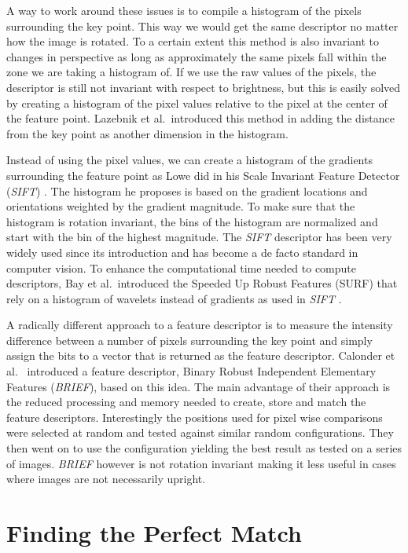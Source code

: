 A way to work around these issues is to compile a histogram of the 
pixels surrounding the key point. This way we would get the same 
descriptor no matter how the image is rotated. To a certain extent this
method is also invariant to changes in perspective as long as 
approximately the same pixels fall within the zone we are taking a 
histogram of. If we use the raw values of the pixels, the descriptor is 
still not invariant with respect to brightness, but this is easily 
solved by creating a histogram of the pixel values relative to the pixel 
at the center of the feature point.  Lazebnik et al.\ introduced this 
method in \cite{lazebnik2003sparse} adding the distance from the key 
point as another dimension in the histogram.

Instead of using the pixel values, we can create a histogram of the 
gradients surrounding the feature point as Lowe did in his Scale 
Invariant Feature Detector (\emph{SIFT}) \cite{lowe2004sift}. The 
histogram he proposes is based on the gradient locations and 
orientations weighted by
the gradient magnitude. To make sure that the histogram is rotation 
invariant, the bins of the histogram are normalized and start with the 
bin of the highest magnitude. The \emph{SIFT} descriptor has been very 
widely used since its introduction and has become a de facto standard in 
computer vision. To enhance the computational time needed to compute 
descriptors, Bay et al.\ introduced the Speeded Up Robust Features 
(SURF) that rely on a histogram of wavelets instead of gradients as used 
in \emph{SIFT} \cite{bay2006surf}. 

A radically different approach to a feature descriptor is to measure the
intensity difference between a number of pixels surrounding the key 
point and simply assign the bits to a vector that is returned as the 
feature descriptor. Calonder et al.\ \cite{calonder2010brief} introduced 
a feature descriptor, Binary Robust Independent Elementary Features 
(\emph{BRIEF}), based on this idea. The main advantage of their approach 
is the reduced processing and memory needed to create, store and match 
the feature descriptors. Interestingly the positions used for pixel wise 
comparisons were selected at random and tested against similar random 
configurations. They then went on to use the configuration yielding the 
best result as tested on a series of images. \emph{BRIEF} however is not 
rotation invariant making it less useful in cases where images are not 
necessarily upright.

\section{Finding the Perfect Match}

